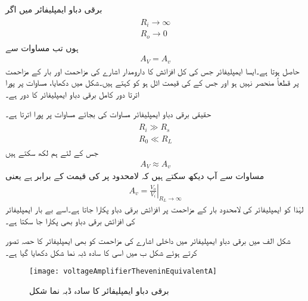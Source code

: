 برقی دباو ایمپلیفائر میں اگر 
\begin{gather} \label{مساوات_قامل_واپسی_دباو_ایمپلیفائر_کے_مزاحمت}
\begin{aligned}
R_i \to \infty \\
R_o \to 0
\end{aligned}
\end{gather}
ہوں تب مساوات   سے
\begin{align} \label{مساوات_واپسی_کامل_دباو_ایمپلیفائر_کی_افزائش}
A_V = A_v
\end{align}
حاصل ہوتا ہے۔ایسا ایمپلیفائر جس کی کل افزائش  کا دارومدار اشارے کی مزاحمت  اور بار کے مزاحمت  پر قطعاً منحصر نہیں ہو اور جس کے   کی قیمت اٹل ہو کو  کہتے ہیں۔شکل  میں دکھایا، مساوات  پر پورا اترتا دور کامل برقی دباو ایمپلیفائر کا دور ہے۔ 

 حقیقی برقی دباو ایمپلیفائر مساوات  کی بجائے مساوات  پر پورا اترتا ہے۔
\begin{gather} \label{مساوات_حقیقی_واپسی_دباو_ایمپلیفائر_کے_مزاحمت}
\begin{aligned}
R_i \gg R_s \\
R_0 \ll R_L
\end{aligned}
\end{gather}
جس کے لئے ہم لکھ سکتے ہیں
\begin{align}  \label{مساوات_واپسی_حقیقی_دباو_ایمپلیفائر_کی_افزائش}
A_V \approx A_v
\end{align}
مساوات  سے آپ دیکھ سکتے ہیں کہ لامحدود  پر  کی قیمت  کے برابر ہے یعنی
\begin{align}
A_v = \left . \frac{V_o}{V_i} \right |_{R_L \to \infty}
\end{align} 
لہٰذا  کو ایمپلیفائر کی لامحدود بار کے مزاحمت پر افزائش برقی دباو پکارا جاتا ہے۔اسے بے بار ایمپلیفائر کی افزائش برقی دباو  بھی پکارا جا سکتا ہے۔

 
شکل  الف میں برقی دباو ایمپلیفائر میں داخلی اشارے کی مزاحمت  کو بھی ایمپلیفائر کا حصہ تصور کرتے ہوئے شکل  ب میں اسی کا سادہ ڈبہ نما شکل دکھایا گیا ہے۔
\begin{figure}
\centering
\texttt{[image: voltageAmplifierTheveninEquivalentA]}
\caption{برقی دباو ایمپلیفائر کا سادہ ڈبہ نما شکل}
\label{شکل_واپسی_دباو_ایمپلیفائر_ڈبہ_شکل}
\end{figure}


